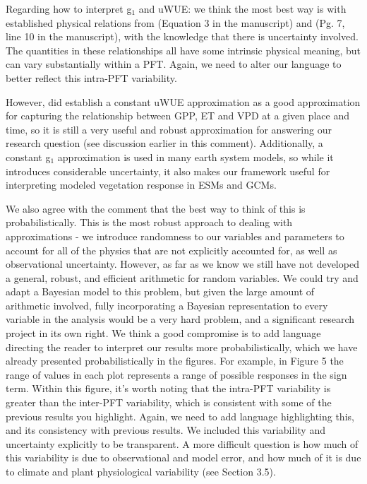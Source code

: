 Regarding how to interpret g$_1$ and uWUE: we think the most best way
is with established physical relations from \cite{MEDLYN_2011}
(Equation 3 in the manuscript) and \cite{Zhou_2014} (Pg. 7, line 10 in
the manuscript), with the knowledge that there is uncertainty
involved. The quantities in these relationships all have some
intrinsic physical meaning, but can vary substantially within a
PFT. Again, we need to alter our language to better reflect this
intra-PFT variability.

However, \cite{Zhou_2014} did establish a constant uWUE approximation
as a good approximation for capturing the relationship between GPP, ET
and VPD at a given place and time, so it is still a very useful and
robust approximation for answering our research question (see
discussion earlier in this comment). Additionally, a constant g$_1$
approximation is used in many earth system models, so while it
introduces considerable uncertainty, it also makes our framework
useful for interpreting modeled vegetation response in ESMs and GCMs.

We also agree with the comment that the best way to think of this is
probabilistically. This is the most robust approach to dealing with
approximations - we introduce randomness to our variables and
parameters to account for all of the physics that are not explicitly
accounted for, as well as observational uncertainty. However, as far
as we know we still have not developed a general, robust, and efficient
arithmetic for random variables. We could try and adapt a Bayesian
model to this problem, but given the large amount of arithmetic
involved, fully incorporating a Bayesian representation to every
variable in the analysis would be a very hard problem, and a
significant research project in its own right. We think a good
compromise is to add language directing the reader to interpret our
results more probabilistically, which we have already presented
probabilistically in the figures. For example, in Figure 5 the range of
values in each plot represents a range of possible responses in the
sign term. Within this figure, it's worth noting that the intra-PFT
variability is greater than the inter-PFT variability, which is
consistent with some of the previous results you highlight. Again, we
need to add language highlighting this, and its consistency with
previous results. We included this variability and uncertainty
explicitly to be transparent. A more difficult question is how much of
this variability is due to observational and model error, and how much
of it is due to climate and plant physiological variability (see
Section 3.5).

